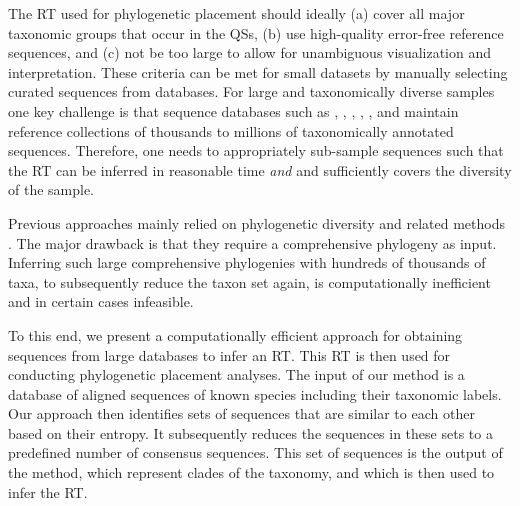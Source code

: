 The \acf{RT} used for phylogenetic placement should ideally
(a) cover all major taxonomic groups that occur in the \acp{QS},
(b) use high-quality error-free reference sequences, and
(c) not be too large to allow for unambiguous visualization and interpretation.
These criteria can be met for small datasets by manually selecting curated sequences from databases.
For large and taxonomically diverse samples one key challenge is that sequence databases such as
 \cite{DeSantis2006},  \cite{Abarenkov2010},  \cite{Guillou2012},
 \cite{Kim2012},  \cite{Quast2013}, and  \cite{Cole2014}
maintain reference collections of thousands to millions of taxonomically annotated sequences.
Therefore, one needs to appropriately sub-sample sequences such that the \ac{RT}
can be inferred in reasonable time {\em and} and sufficiently covers the diversity of the sample.

Previous approaches mainly relied on phylogenetic diversity
\cite{Faith1992,Pardi2005,Minh2006} and related methods \cite{Matsen2013}.
The major drawback is that they require a comprehensive phylogeny as input.
Inferring such large comprehensive phylogenies with hundreds of thousands of taxa,
to subsequently reduce the taxon set again, is computationally inefficient and in certain cases infeasible.

To this end, we present a computationally efficient approach
for obtaining sequences from large databases to infer an \ac{RT}.
This \ac{RT} is then used for conducting phylogenetic placement analyses.
The input of our method is a database of aligned sequences of known species including their taxonomic labels.
Our approach then identifies sets of sequences that are similar to each other based on their entropy.
It subsequently reduces the sequences in these sets to a predefined number of consensus sequences.
This set of sequences is the output of the method, which represent clades of the taxonomy,
and which is then used to infer the \ac{RT}.


